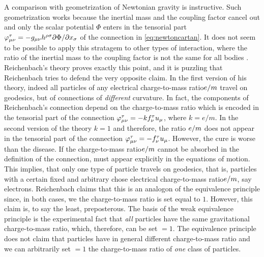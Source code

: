 \documentclass[submitted]{article}
\newcommand{\ctmr}{charge-to-mass ratio\xspace}
\newcommand{\ctmrf}{\ensuremath{\hfrac{e}{m}}\xspace}
\newcommand{\RTo}{\ensuremath{\varphi\tmn=-k f^\tau_\nu u_\mu}\xspace}
\newcommand{\RTt}{\ensuremath{\varphi\tmn=-f^\tau_\nu u_\mu}\xspace}
\newcommand{\FT}{\ensuremath{\varphi\tmn = - g_{\mu \nu} h^{\rho \sigma} \hfrac{\partial \Phi}{\partial x_\sigma}}\xspace}
\begin{document}
A comparison with  geometrization of Newtonian gravity is instructive. Such geometrization works because the inertial mass and the coupling factor cancel out and only the scalar potential $\Phi$ enters in the tensorial part \FT of the connection in \cref{eq:newtoncartan}. It does not seem to be possible to apply this stratagem to other types of interaction, where the ratio of the inertial mass to the coupling factor is not the same for all bodies \citep[197]{Friedman1983}. Reichenbach's theory proves exactly this point, and it is puzzling that Reichenbach tries to defend the very opposite claim. In the first version of his theory, indeed all particles of any electrical \ctmr \ctmrf travel on geodesics, but of connections of \emph{different} curvature. In fact, the components of Reichenbach's connection depend on the \ctmr which is encoded in the tensorial part of the connection \RTo, where $k= e/m$. In the second version of the theory $k=1$ and therefore, the ratio \ctmrf does not appear in the tensorial part of the connection \RTt. However, the cure is worse than the disease. If the \ctmr \ctmrf cannot be absorbed in the definition of the connection, must appear explicitly in the equations of motion. This implies, that only one type of particle travels on geodesics, that is, particles with a certain fixed and arbitrary chose electrical \ctmr \ctmrf, say electrons. Reichenbach claims that this is an analogon of the equivalence principle since, in both cases, we the \ctmr is set equal to $1$. However, this claim is, to say the least, preposterous. The basis of the weak equivalence principle is the experimental fact that \emph{all} particles have the same gravitational \ctmr, which, therefore, can be set $=1$. The equivalence principle does not claim that particles have in general different \ctmr and we can arbitrarily set $=1$ the \ctmr of \emph{one} class of particles. 
\end{document}
